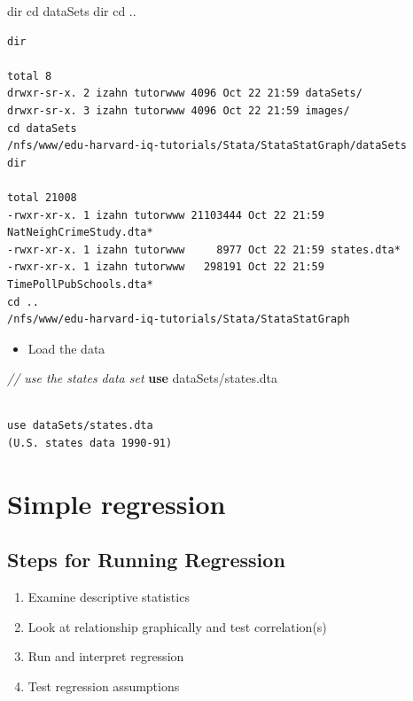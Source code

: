 \documentclass[]{book}
\newenvironment{Shaded}{\begin{snugshade}}{\end{snugshade}}
\newcommand{\CommentTok}[1]{\textcolor[rgb]{0.56,0.35,0.01}{\textit{#1}}}
\newcommand{\KeywordTok}[1]{\textcolor[rgb]{0.13,0.29,0.53}{\textbf{#1}}}
\newcommand{\NormalTok}[1]{#1}
\newcommand{\OtherTok}[1]{\textcolor[rgb]{0.56,0.35,0.01}{#1}}
\providecommand{\tightlist}{%
  \setlength{\itemsep}{0pt}\setlength{\parskip}{0pt}}
\begin{document}
\begin{Shaded}
\begin{Highlighting}[]
  \OtherTok{dir}
\NormalTok{  cd dataSets}
  \OtherTok{dir}
\NormalTok{  cd ..}
\end{Highlighting}
\end{Shaded}

\begin{verbatim}
dir

total 8
drwxr-sr-x. 2 izahn tutorwww 4096 Oct 22 21:59 dataSets/
drwxr-sr-x. 3 izahn tutorwww 4096 Oct 22 21:59 images/
cd dataSets
/nfs/www/edu-harvard-iq-tutorials/Stata/StataStatGraph/dataSets
dir

total 21008
-rwxr-xr-x. 1 izahn tutorwww 21103444 Oct 22 21:59 NatNeighCrimeStudy.dta*
-rwxr-xr-x. 1 izahn tutorwww     8977 Oct 22 21:59 states.dta*
-rwxr-xr-x. 1 izahn tutorwww   298191 Oct 22 21:59 TimePollPubSchools.dta*
cd ..
/nfs/www/edu-harvard-iq-tutorials/Stata/StataStatGraph
\end{verbatim}

\begin{itemize}
\tightlist
\item
  Load the data
\end{itemize}

\begin{Shaded}
\begin{Highlighting}[]
  \CommentTok{// use the states data set}
  \KeywordTok{use}\NormalTok{ dataSets/states.dta}
\end{Highlighting}
\end{Shaded}

\begin{verbatim}

use dataSets/states.dta
(U.S. states data 1990-91)
\end{verbatim}

\hypertarget{simple-regression}{%
\section{Simple regression}\label{simple-regression}}

\hypertarget{steps-for-running-regression}{%
\subsection{Steps for Running Regression}\label{steps-for-running-regression}}

\begin{enumerate}
\def\labelenumi{\arabic{enumi}.}
\tightlist
\item
  Examine descriptive statistics
\item
  Look at relationship graphically and test correlation(s)
\item
  Run and interpret regression
\item
  Test regression assumptions
\end{enumerate}
\end{document}
